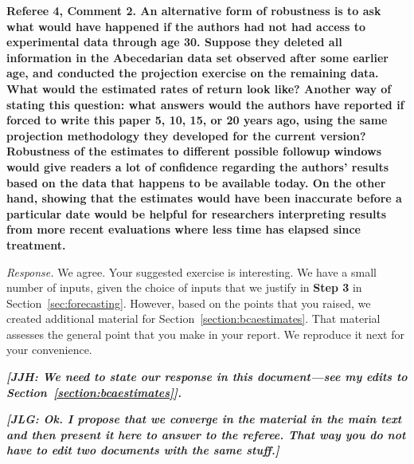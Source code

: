 \noindent \textbf{Referee 4, Comment 2. An alternative form of robustness is to ask what would have happened if the authors had not had access to experimental data through age 30. Suppose they deleted all information in the Abecedarian data set observed after some earlier age, and conducted the projection exercise on the remaining data. What would the estimated rates of return look like? Another way of stating this question: what answers would the authors have reported if forced to write this paper 5, 10, 15, or 20 years ago, using the same projection methodology they developed for the current version? Robustness of the estimates to different possible followup windows would give readers a lot of confidence regarding the authors' results based on the data that happens to be available today. On the other hand, showing that the estimates would have been inaccurate before a particular date would be helpful for researchers interpreting results from more recent evaluations where less time has elapsed since treatment.}

\noindent \textit{Response.} We agree. Your suggested exercise is interesting. We have a small number of inputs, given the choice of inputs that we justify in \textbf{Step 3} in Section~\ref{sec:forecasting}. However, based on the points that you raised, we created additional material for Section~\ref{section:bcaestimates}. That material assesses the general point that you make in your report. We reproduce it next for your convenience. 

\noindent \textbf{\textit{[JJH: We need to state our response in this document---see my edits to Section~\ref{section:bcaestimates}].}}

\noindent \textbf{\textit{[JLG: Ok. I propose that we converge in the material in the main text and then present it here to answer to the referee. That way you do not have to edit two documents with the same stuff.]}}



\singlespace




